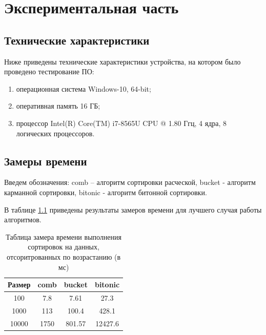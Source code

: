 \documentclass[12pt]{report}
\begin{document}
	\chapter{Экспериментальная часть}
	
	\section{Технические характеристики}
	
	Ниже приведены технические характеристики устройства, на котором было проведено тестирование ПО:
	
	\begin{enumerate}
		\item[1)] операционная система Windows-10, 64-bit;
		\item[2)] оперативная память 16 ГБ;
		\item[3)] процессор Intel(R) Core(TM) i7-8565U CPU @ 1.80 Ггц, 4 ядра, 8 логических процессоров.
	\end{enumerate}
	
	\section{Замеры времени}
	
	Введем обозначения: comb -- алгоритм сортировки расческой, bucket - алгоритм карманной сортировки, bitonic - алгоритм битонной сортировки. 
	
	В таблице \ref{table:t1} приведены результаты замеров времени для лучшего случая работы алгоритмов.
	
	\begin{table} [H]
		\caption{Таблица замера времени выполнения сортировок на данных, отсоритрованных по возрастанию (в мс)}
		\label{table:t1}
		\begin{center}
			\begin{tabular}{|c | c | c | c|}
				
				\hline
				
				Размер & comb & bucket & bitonic  \\ [0.5ex]
				
				\hline
				
				100 & 7.8 & 7.61 & 27.3 \\ 
				
				\hline 
				
				1000 & 113 & 100.4 & 428.1 \\ 
				
				\hline 
				
				10000 & 1750 & 801.57 & 12427.6 \\ 
				
				\hline 
			\end{tabular}
		\end{center}
	\end{table}
\end{document}
